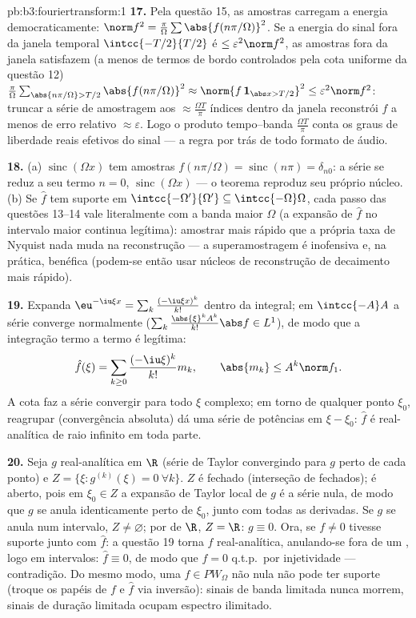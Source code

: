 \begin{solution}{pb:b3:fouriertransform:1}
\textbf{17.} Pela questão 15, as amostras carregam a energia
democraticamente: $\norm f^2 = \frac\pi\Omega\sum
\abs{f(n\pi/\Omega)}^2$. Se a energia do sinal fora da
janela temporal $\intcc{-T/2}{T/2}$ é $\leq \varepsilon^2\norm
f^2$, as amostras fora da janela satisfazem (a menos de termos de bordo
controlados pela cota uniforme da questão 12)
$\frac\pi\Omega\sum_{\abs{n\pi/\Omega} > T/2}
\abs{f(n\pi/\Omega)}^2 \approx \norm{f\,\mathbf 1_{\abs x >
T/2}}^2 \leq \varepsilon^2\norm f^2$: truncar a
série de amostragem aos $\approx \frac{\Omega T}\pi$
índices dentro da janela reconstrói $f$ a menos de erro relativo
$\approx\varepsilon$. Logo o produto tempo--banda
$\frac{\Omega T}{\pi}$ conta os graus de liberdade reais efetivos
do sinal --- a regra por trás de todo formato de
áudio.

\textbf{18.} (a) $\operatorname{sinc}(\Omega x)$ tem
amostras $f(n\pi/\Omega) = \operatorname{sinc}(n\pi) =
\delta_{n0}$: a série se reduz a seu termo $n = 0$,
$\operatorname{sinc}(\Omega x)$ --- o teorema reproduz
seu próprio núcleo. (b) Se $\hat f$ tem suporte em
$\intcc{-\Omega'}{\Omega'} \subseteq
\intcc{-\Omega}\Omega$, cada passo das questões 13--14 vale
literalmente com a banda maior $\Omega$ (a expansão de
$\hat f$ no intervalo maior continua legítima):
amostrar mais rápido que a própria taxa de Nyquist nada muda
na reconstrução --- a superamostragem é inofensiva e, na
prática, benéfica (podem-se então usar núcleos de reconstrução
de decaimento mais rápido).

\textbf{19.} Expanda $\eu^{-\iu\xi x} =
\sum_k\frac{(-\iu\xi x)^k}{k!}$ dentro da integral; em
$\intcc{-A}A$ a série converge normalmente
($\sum_k\frac{\abs{\xi}^kA^k}{k!}\abs f \in L^1$), de modo que a
integração termo a termo é legítima:
\[
\hat f(\xi) = \sum_{k\geq0}\frac{(-\iu\xi)^k}{k!}m_k,
\qquad \abs{m_k} \leq A^k\norm f_1 .
\]
A cota faz a série convergir para todo $\xi$ complexo;
em torno de qualquer ponto $\xi_0$, reagrupar (convergência absoluta)
dá uma série de potências em $\xi - \xi_0$: $\hat f$ é
real-analítica de raio infinito em toda parte.

\textbf{20.} Seja $g$ real-analítica em $\R$ (série de Taylor
convergindo para $g$ perto de cada ponto) e $Z = \{\xi :
g^{(k)}(\xi) = 0\ \forall k\}$. $Z$ é fechado (interseção
de fechados); é aberto, pois em $\xi_0 \in Z$ a expansão de
Taylor local de $g$ é a série nula, de modo que $g$ se anula
identicamente perto de $\xi_0$, junto com todas as derivadas. Se
$g$ se anula num intervalo, $Z \neq \varnothing$; por
 de $\R$, $Z = \R$: $g \equiv 0$. Ora, se $f
\neq 0$ tivesse suporte  junto com $\hat f$: a questão
19 torna $\hat f$ real-analítica, anulando-se fora de um ,
logo em intervalos: $\hat f \equiv 0$, de modo que $f = 0$ q.t.p.\ por
injetividade --- contradição. Do mesmo modo, uma $f \in
PW_\Omega$ não nula não pode ter suporte  (troque os papéis de
$f$ e $\hat f$ via inversão): sinais de banda limitada nunca
morrem, sinais de duração limitada ocupam espectro ilimitado.


\end{solution}

